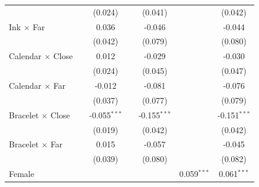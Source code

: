 \begin{tabular}{lcccccc}
                                                         &              & (0.024)                      &               & (0.041)                       &               & (0.042)\\   
   Ink $\times$ Far                                      &              & 0.036                        &               & -0.046                        &               & -0.044\\   
                                                         &              & (0.042)                      &               & (0.079)                       &               & (0.080)\\   
   Calendar $\times$ Close                               &              & 0.012                        &               & -0.029                        &               & -0.030\\   
                                                         &              & (0.024)                      &               & (0.045)                       &               & (0.047)\\   
   Calendar $\times$ Far                                 &              & -0.012                       &               & -0.081                        &               & -0.076\\   
                                                         &              & (0.037)                      &               & (0.077)                       &               & (0.079)\\   
   Bracelet $\times$ Close                               &              & -0.055$^{***}$               &               & -0.155$^{***}$                &               & -0.151$^{***}$\\   
                                                         &              & (0.019)                      &               & (0.042)                       &               & (0.042)\\   
   Bracelet $\times$ Far                                 &              & 0.015                        &               & -0.057                        &               & -0.045\\   
                                                         &              & (0.039)                      &               & (0.080)                       &               & (0.082)\\   
   Female                                                &              &                              &               &                               & 0.059$^{***}$ & 0.061$^{***}$\\   

\end{tabular}
